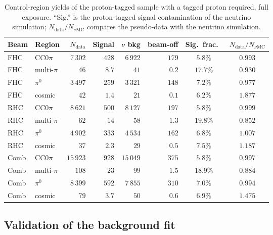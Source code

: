 \documentclass[11pt,a4paper]{article}
\begin{document}
\begin{table}[H]
  \centering
  \caption{Control-region yields of the proton-tagged sample with a tagged proton required, full exposure.
    ``Sig.'' is the proton-tagged signal contamination of the neutrino simulation;
    $N_\mathrm{data}/N_{\nu\mathrm{MC}}$ compares the pseudo-data with the neutrino simulation.}
  \label{tab:sidebands_1p}
  \small
  \begin{tabular}{llrrrrcc}
    \toprule
    Beam & Region & $N_\mathrm{data}$ & Signal & $\nu$ bkg & beam-off & Sig.\ frac.\ & $N_\mathrm{data}/N_{\nu\mathrm{MC}}$ \\
    \midrule
    FHC & CC$0\pi$ & $7\,302$ & $428$ & $6\,922$ & $179$ & $5.8\%$ & $0.993$ \\
    FHC & multi-$\pi$ & $46$ & $8.7$ & $41$ & $0.2$ & $17.7\%$ & $0.930$ \\
    FHC & $\pi^0$ & $3\,497$ & $259$ & $3\,321$ & $148$ & $7.2\%$ & $0.977$ \\
    FHC & cosmic & $42$ & $1.4$ & $21$ & $0.1$ & $6.2\%$ & $1.877$ \\
    RHC & CC$0\pi$ & $8\,621$ & $500$ & $8\,127$ & $197$ & $5.8\%$ & $0.999$ \\
    RHC & multi-$\pi$ & $62$ & $14$ & $58$ & $1.3$ & $19.8\%$ & $0.852$ \\
    RHC & $\pi^0$ & $4\,902$ & $333$ & $4\,534$ & $162$ & $6.8\%$ & $1.007$ \\
    RHC & cosmic & $37$ & $2.3$ & $29$ & $0.5$ & $7.5\%$ & $1.187$ \\
    Comb & CC$0\pi$ & $15\,923$ & $928$ & $15\,049$ & $375$ & $5.8\%$ & $0.997$ \\
    Comb & multi-$\pi$ & $108$ & $23$ & $99$ & $1.5$ & $18.9\%$ & $0.884$ \\
    Comb & $\pi^0$ & $8\,399$ & $592$ & $7\,855$ & $310$ & $7.0\%$ & $0.994$ \\
    Comb & cosmic & $79$ & $3.7$ & $50$ & $0.6$ & $6.9\%$ & $1.475$ \\
    \bottomrule
  \end{tabular}
\end{table}

\subsection{Validation of the background fit}
\label{sec:bkgfit_validation}
\end{document}
